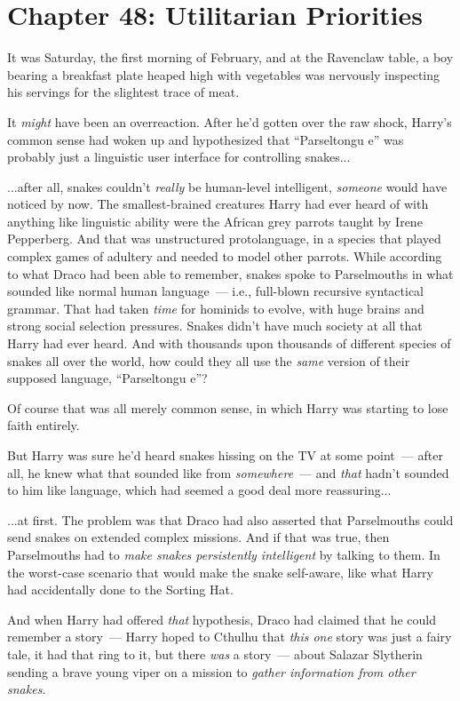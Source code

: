 \chapter{Chapter 48: Utilitarian Priorities}
It was Saturday, the first morning of February, and at the Ravenclaw table, a boy bearing a breakfast plate heaped high with vegetables was nervously inspecting his servings for the slightest trace of meat.

It \emph{might} have been an overreaction. After he'd gotten over the raw shock, Harry's common sense had woken up and hypothesized that ``Parseltongu e'' was probably just a linguistic user interface for controlling snakes...

...after all, snakes couldn't \emph{really} be human-level intelligent, \emph{someone} would have noticed by now. The smallest-brained creatures Harry had ever heard of with anything like linguistic ability were the African grey parrots taught by Irene Pepperberg. And that was unstructured protolanguage, in a species that played complex games of adultery and needed to model other parrots. While according to what Draco had been able to remember, snakes spoke to Parselmouths in what sounded like normal human language~--- i.e., full-blown recursive syntactical grammar. That had taken \emph{time} for hominids to evolve, with huge brains and strong social selection pressures. Snakes didn't have much society at all that Harry had ever heard. And with thousands upon thousands of different species of snakes all over the world, how could they all use the \emph{same} version of their supposed language, ``Parseltongu e''?

Of course that was all merely common sense, in which Harry was starting to lose faith entirely.

But Harry was sure he'd heard snakes hissing on the TV at some point~--- after all, he knew what that sounded like from \emph{somewhere}~--- and \emph{that} hadn't sounded to him like language, which had seemed a good deal more reassuring...

...at first. The problem was that Draco had also asserted that Parselmouths could send snakes on extended complex missions. And if that was true, then Parselmouths had to \emph{make snakes persistently intelligent} by talking to them. In the worst-case scenario that would make the snake self-aware, like what Harry had accidentally done to the Sorting Hat.

And when Harry had offered \emph{that} hypothesis, Draco had claimed that he could remember a story~--- Harry hoped to Cthulhu that \emph{this one} story was just a fairy tale, it had that ring to it, but there \emph{was} a story~--- about Salazar Slytherin sending a brave young viper on a mission to \emph{gather information from other snakes.}

